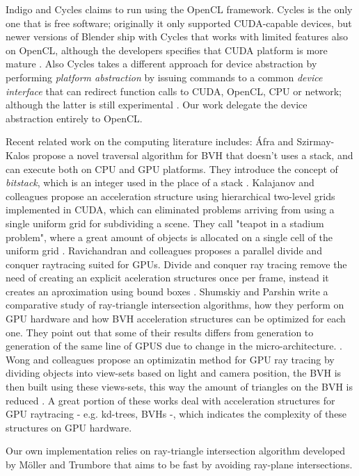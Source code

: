 \documentclass[a4paper]{sbgames}               %
\begin{document}
Indigo and Cycles claims to run using the OpenCL framework. Cycles
is the only one that is free software; originally it only supported
CUDA-capable devices, but newer versions of Blender ship with Cycles
that works with limited features also on OpenCL, although the
developers specifies that CUDA platform is more mature \cite{Cycles}.
Also Cycles takes a different approach for device abstraction by
performing \emph{platform abstraction} by issuing commands to a common
\emph{device interface} that can redirect function calls to CUDA,
OpenCL, CPU or network; although the latter is still experimental
\cite{CyclesDevel}. Our work delegate the device abstraction entirely
to OpenCL.

Recent related work on the computing literature includes: Áfra and
Szirmay-Kalos propose a novel traversal algorithm for BVH that doesn't
uses a stack, and can execute both on CPU and GPU platforms. They
introduce the concept of \emph{bitstack}, which is an integer used in
the place of a stack \cite{Afra}. Kalajanov and colleagues propose an
acceleration structure using hierarchical two-level grids implemented
in CUDA, which can eliminated problems arriving from using a single
uniform grid for subdividing a scene. They call "teapot in a stadium
problem", where a great amount of objects is allocated on a single
cell of the uniform grid \cite{Kalojanov}. Ravichandran and colleagues
proposes a parallel divide and conquer raytracing suited for
GPUs. Divide and conquer ray tracing remove the need of creating an
explicit aceleration structures once per frame, instead it creates an
aproximation using bound boxes \cite{Ravichandran}. Shumskiy and
Parshin write a comparative study of ray-triangle intersection
algorithms, how they perform on GPU hardware and how BVH acceleration
structures can be optimized for each one. They point out that some of
their results differs from generation to generation of the same line
of GPUS due to change in the micro-architecture.
\cite{Shumskiy}. Wong and colleagues propose an optimizatin method for
GPU ray tracing by dividing objects into view-sets based on light and
camera position, the BVH is then built using these views-sets, this
way the amount of triangles on the BVH is reduced \cite{Wong}. A great
portion of these works deal with acceleration structures for GPU
raytracing - e.g. kd-trees, BVHs -, which indicates the complexity of
these structures on GPU hardware.

Our own implementation relies on ray-triangle intersection algorithm
developed by Möller and Trumbore that aims to be fast by avoiding
ray-plane intersections\cite{moller}.
\end{document}
